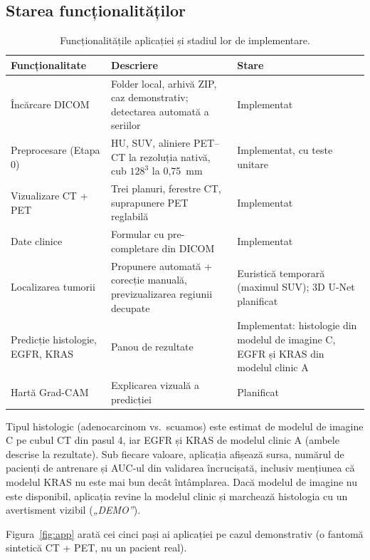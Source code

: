 \documentclass[11pt, a4paper]{article}
\begin{document}
\subsection{Starea funcționalităților}

\begin{table}[h]
\centering
\small
\begin{tabular}{@{}p{4.2cm}p{7.2cm}p{3.2cm}@{}}
\toprule
\textbf{Funcționalitate} & \textbf{Descriere} & \textbf{Stare} \\ \midrule
Încărcare DICOM & Folder local, arhivă ZIP, caz demonstrativ; detectarea automată a seriilor & Implementat \\
Preprocesare (Etapa 0) & HU, SUV, aliniere PET--CT la rezoluția nativă, cub $128^3$ la 0,75~mm & Implementat, cu teste unitare \\
Vizualizare CT + PET & Trei planuri, ferestre CT, suprapunere PET reglabilă & Implementat \\
Date clinice & Formular cu pre-completare din DICOM & Implementat \\
Localizarea tumorii & Propunere automată + corecție manuală, previzualizarea regiunii decupate & Euristică temporară (maximul SUV); 3D U-Net planificat \\
Predicție histologie, EGFR, KRAS & Panou de rezultate & Implementat: histologie din modelul de imagine C, EGFR și KRAS din modelul clinic A \\
Hartă Grad-CAM & Explicarea vizuală a predicției & Planificat \\ \bottomrule
\end{tabular}
\caption{Funcționalitățile aplicației și stadiul lor de implementare.}
\end{table}

Tipul histologic (adenocarcinom vs.\ scuamos) este estimat de modelul de imagine C pe cubul CT din pasul 4, iar EGFR și KRAS de modelul clinic A (ambele descrise la rezultate). Sub fiecare valoare, aplicația afișează sursa, numărul de pacienți de antrenare și AUC-ul din validarea încrucișată, inclusiv mențiunea că modelul KRAS nu este mai bun decât întâmplarea. Dacă modelul de imagine nu este disponibil, aplicația revine la modelul clinic și marchează histologia cu un avertisment vizibil (\textit{„DEMO''}).

Figura~\ref{fig:app} arată cei cinci pași ai aplicației pe cazul demonstrativ (o fantomă sintetică CT + PET, nu un pacient real).
\end{document}
